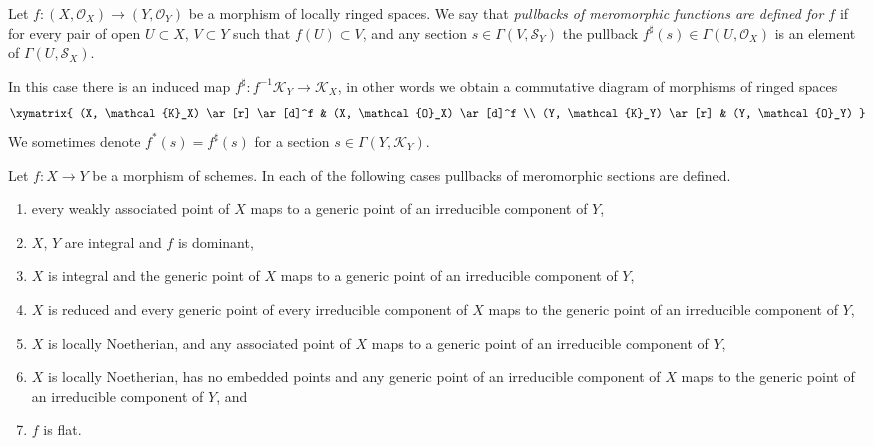 \begin{definition}
\label{definition-pullback-meromorphic-sections}
Let $f : (X, \mathcal{O}_X) \to (Y, \mathcal{O}_Y)$ be a morphism
of locally ringed spaces. We say that {\it pullbacks of meromorphic
functions are defined for $f$} if for every pair of open
$U \subset X$, $V \subset Y$ such that $f(U) \subset V$, and any
section $s \in \Gamma(V, \mathcal{S}_Y)$ the pullback
$f^\sharp(s) \in \Gamma(U, \mathcal{O}_X)$ is an element
of $\Gamma(U, \mathcal{S}_X)$.
\end{definition}

\noindent
In this case there is an induced map
$f^\sharp : f^{-1}\mathcal{K}_Y \to \mathcal{K}_X$,
in other words we obtain a commutative diagram of morphisms
of ringed spaces
$$
\xymatrix{
(X, \mathcal{K}_X) \ar[r] \ar[d]^f &
(X, \mathcal{O}_X) \ar[d]^f \\
(Y, \mathcal{K}_Y) \ar[r] &
(Y, \mathcal{O}_Y)
}
$$
We sometimes denote $f^*(s) = f^\sharp(s)$ for a
section $s \in \Gamma(Y, \mathcal{K}_Y)$.

\begin{lemma}
\label{lemma-pullback-meromorphic-sections-defined}
Let $f : X \to Y$ be a morphism of schemes.
In each of the following cases pullbacks of meromorphic
sections are defined.
\begin{enumerate}
\item every weakly associated point of $X$ maps to
a generic point of an irreducible component of $Y$,
\item $X$, $Y$ are integral and $f$ is dominant,
\item $X$ is integral and the generic point of $X$ maps
to a generic point of an irreducible component of $Y$,
\item $X$ is reduced and every generic point of every irreducible
component of $X$ maps to the generic point of an irreducible component
of $Y$,
\item $X$ is locally Noetherian, and any associated point of
$X$ maps to a generic point of an irreducible component of $Y$,
\item $X$ is locally Noetherian, has no embedded points and
any generic point of an irreducible component of
$X$ maps to the generic point of an irreducible component of $Y$, and
\item $f$ is flat.
\end{enumerate}
\end{lemma}


